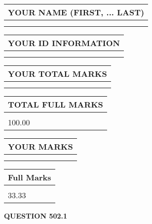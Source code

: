 \documentclass{ctexart}
\begin{document}
   
   
   
\newpage 
\setcounter{page}{ 
   502001 } 
   
   
   
   
\noindent\begin{tabular}{|l|}
\hline
YOUR NAME (FIRST, ... LAST)  \\
\hline
 \\ 
 \\ 
\hline
\end{tabular}
\hspace{0.05in} \begin{tabular}{|l|}
\hline
 YOUR   ID   INFORMATION  \\
\hline
 \\ 
 \\ 
\hline
\end{tabular}
   
   
\vspace{0.2in}\noindent\begin{tabular}{|l|}
\hline
YOUR TOTAL MARKS  \\
\hline
 \\ 
 \\ 
\hline
\end{tabular}
\hspace{0.05in} \begin{tabular}{|l|}
\hline
TOTAL FULL MARKS  \\
\hline
 \\ 
100.00 \\
\hline
\end{tabular}
   
   
 \vspace{0.2in}
 
 
 
 
   
   
  
\vspace{0.2in}
  
\noindent\begin{tabular}{|l|}
\hline
 YOUR MARKS  \\
\hline
 \\ 
 \\ 
\hline
\end{tabular}
\hspace{0.05in} \begin{tabular}{|l|}
\hline
 Full Marks  \\
\hline
 \\ 
33.33 \\
\hline
\end{tabular}
{\textbf{\Large{QUESTION
502.1 
}}}
  
\end{document}
